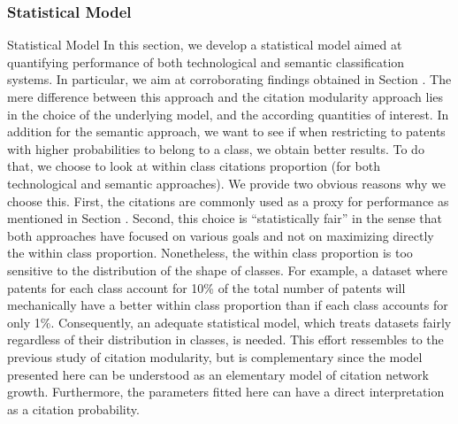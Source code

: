 \subsubsection*{Statistical Model}{Statistical Model}
\label{statisticalmodel}
In this section, we develop a statistical model aimed at quantifying performance of both technological and semantic classification systems. In particular, we aim at corroborating findings obtained in Section . The mere difference between this approach and the citation modularity approach lies in the choice of the underlying model, and the according quantities of interest. In addition for the semantic approach, we want to see if when restricting to patents with higher probabilities to belong to a class, we obtain better results. To do that, we choose to look at within class citations proportion (for both technological and semantic approaches). We provide two obvious reasons why we choose this. First, the citations are commonly used as a proxy for performance as mentioned in Section . Second, this choice is ``statistically fair'' in the sense that both approaches have focused on various goals and not on maximizing directly the within class proportion. 
Nonetheless, the within class proportion is too sensitive to the distribution of the shape of classes. For example, a dataset where patents for each class account for 10\% of the total number of patents will mechanically have a better within class proportion than if each class accounts for only 1\%. Consequently, an adequate statistical model, which treats datasets fairly regardless of their distribution in classes, is needed. This effort ressembles to the previous study of citation modularity, but is complementary since the model presented here can be understood as an elementary model of citation network growth. Furthermore, the parameters fitted here can have a direct interpretation as a citation probability.

